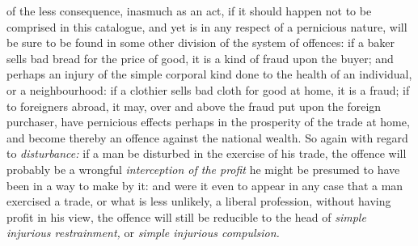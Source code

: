 \documentclass[12pt]{report}
\begin{document}
of the less consequence, inasmuch as an act, if it should happen not to
be comprised in this catalogue, and yet is in any respect of a
pernicious nature, will be sure to be found in some other division of
the system of offences: if a baker sells bad bread for the price of
good, it is a kind of fraud upon the buyer; and perhaps an injury of the
simple corporal kind done to the health of an individual, or a
neighbourhood: if a clothier sells bad cloth for good at home, it is a
fraud; if to foreigners abroad, it may, over and above the fraud put
upon the foreign purchaser, have pernicious effects perhaps in the
prosperity of the trade at home, and become thereby an offence against
the national wealth. So again with regard to \emph{disturbance:} if a
man be disturbed in the exercise of his trade, the offence will probably
be a wrongful \emph{interception of the profit} he might be presumed to
have been in a way to make by it: and were it even to appear in any case
that a man exercised a trade, or what is less unlikely, a liberal
profession, without having profit in his view, the offence will still be
reducible to the head of \emph{simple injurious restrainment,} or
\emph{simple injurious compulsion.}\\
\end{document}
